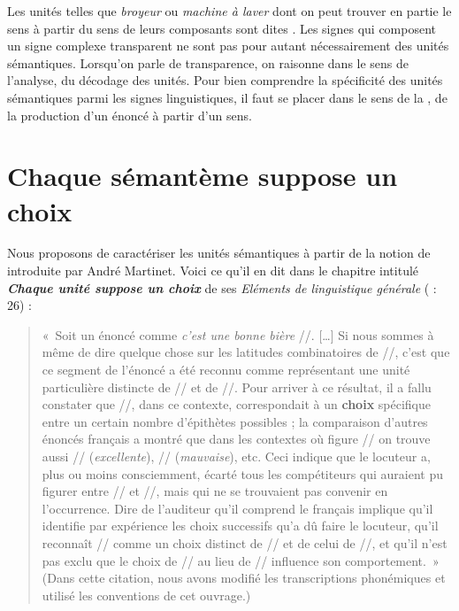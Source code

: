 Les unités telles que \textit{broyeur} ou \textit{machine à laver} dont on peut trouver en partie le sens à partir du sens de leurs composants sont dites . Les signes qui composent un signe complexe transparent ne sont pas pour autant nécessairement des unités sémantiques. Lorsqu’on parle de transparence, on raisonne dans le sens de l’analyse, du décodage des unités. Pour bien comprendre la spécificité des unités sémantiques parmi les signes linguistiques, il faut se placer dans le sens de la , de la production d’un énoncé à partir d’un sens.

\section{Chaque sémantème suppose un choix}\label{sec:2.3.1}

Nous proposons de caractériser les unités sémantiques à partir de la notion de  introduite par André Martinet. Voici ce qu’il en dit dans le chapitre intitulé \textbf{\textit{Chaque unité suppose un choix}} de ses \textit{Eléments de linguistique générale} (\citeyear{martinet1960elements} : 26) :

\begin{quote}
    «~Soit un énoncé comme \textit{c’est une bonne bière} //. […] Si nous sommes à même de dire quelque chose sur les latitudes combinatoires de //, c’est que ce segment de l’énoncé a été reconnu comme représentant une unité particulière distincte de // et de //. Pour arriver à ce résultat, il a fallu constater que //, dans ce contexte, correspondait à un \textbf{choix} spécifique entre un certain nombre d’épithètes possibles ; la comparaison d’autres énoncés français a montré que dans les contextes où figure // on trouve aussi // (\textit{excellente}), // (\textit{mauvaise}), etc. Ceci indique que le locuteur a, plus ou moins consciemment, écarté tous les compétiteurs qui auraient pu figurer entre // et //, mais qui ne se trouvaient pas convenir en l’occurrence. Dire de l’auditeur qu’il comprend le français implique qu’il identifie par expérience les choix successifs qu’a dû faire le locuteur, qu’il reconnaît // comme un choix distinct de // et de celui de //, et qu’il n’est pas exclu que le choix de // au lieu de // influence son comportement.~» (Dans cette citation, nous avons modifié les transcriptions phonémiques et utilisé les conventions de cet ouvrage.)
\end{quote}

